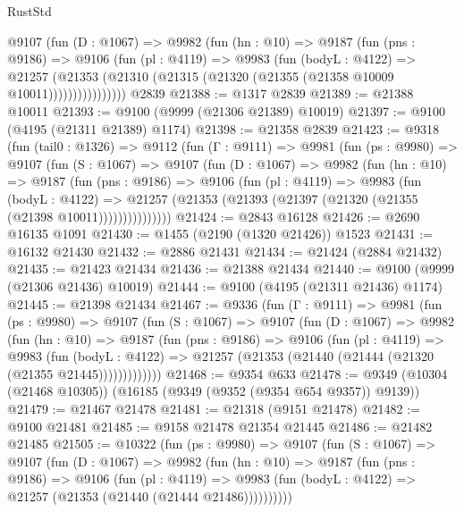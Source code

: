 \begin{lexlean}{RustStd}
\begin{coremodule}
            @9107
              (fun (D : @1067) =>
              @9982
                (fun (hn : @10) =>
                @9187
                  (fun (pns : @9186) =>
                  @9106
                    (fun (pl : @4119) =>
                    @9983
                      (fun (bodyL : @4122) =>
                      @21257
                        (@21353
                          (@21310 (@21315 (@21320 (@21355 (@21358 @10009 @10011))))))))))))))))
    @2839
@21388 := @1317 @2839
@21389 := @21388 @10011
@21393 := @9100 (@9999 (@21306 @21389) @10019)
@21397 := @9100 (@4195 (@21311 @21389) @1174)
@21398 := @21358 @2839
@21423 := @9318
    (fun (tail0 : @1326) =>
    @9112
      (fun (Γ : @9111) =>
      @9981
        (fun (ps : @9980) =>
        @9107
          (fun (S : @1067) =>
          @9107
            (fun (D : @1067) =>
            @9982
              (fun (hn : @10) =>
              @9187
                (fun (pns : @9186) =>
                @9106
                  (fun (pl : @4119) =>
                  @9983
                    (fun (bodyL : @4122) =>
                    @21257 (@21353 (@21393 (@21397 (@21320 (@21355 (@21398 @10011)))))))))))))))
@21424 := @2843 @16128
@21426 := @2690 @16135 @1091
@21430 := @1455 (@2190 (@1320 @21426)) @1523
@21431 := @16132 @21430
@21432 := @2886 @21431
@21434 := @21424 (@2884 @21432)
@21435 := @21423 @21434
@21436 := @21388 @21434
@21440 := @9100 (@9999 (@21306 @21436) @10019)
@21444 := @9100 (@4195 (@21311 @21436) @1174)
@21445 := @21398 @21434
@21467 := @9336
    (fun (Γ : @9111) =>
    @9981
      (fun (ps : @9980) =>
      @9107
        (fun (S : @1067) =>
        @9107
          (fun (D : @1067) =>
          @9982
            (fun (hn : @10) =>
            @9187
              (fun (pns : @9186) =>
              @9106
                (fun (pl : @4119) =>
                @9983
                  (fun (bodyL : @4122) =>
                  @21257 (@21353 (@21440 (@21444 (@21320 (@21355 @21445)))))))))))))
@21468 := @9354 @633
@21478 := @9349 (@10304 (@21468 @10305)) (@16185 (@9349 (@9352 (@9354 @654 @9357)) @9139))
@21479 := @21467 @21478
@21481 := @21318 (@9151 @21478)
@21482 := @9100 @21481
@21485 := @9158 @21478 @21354 @21445
@21486 := @21482 @21485
@21505 := @10322
    (fun (ps : @9980) =>
    @9107
      (fun (S : @1067) =>
      @9107
        (fun (D : @1067) =>
        @9982
          (fun (hn : @10) =>
          @9187
            (fun (pns : @9186) =>
            @9106
              (fun (pl : @4119) =>
              @9983 (fun (bodyL : @4122) => @21257 (@21353 (@21440 (@21444 @21486))))))))))

\end{coremodule}
\end{lexlean}
